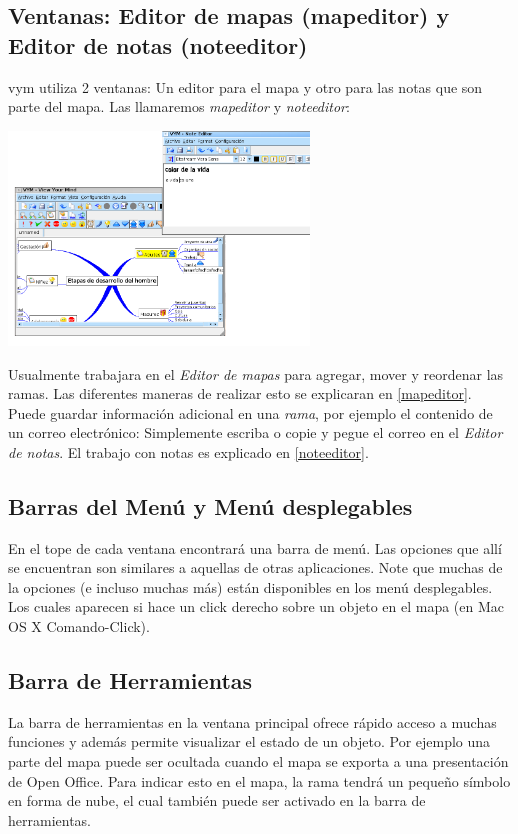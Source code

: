 \documentclass{article}
\newcommand{\vym}{{\sc vym }}
\begin{document}
\subsection{Ventanas: Editor de mapas (mapeditor) y Editor de notas (noteeditor)}
\vym utiliza 2 ventanas: Un editor para el mapa y otro para las notas que son parte del mapa. Las llamaremos  {\em mapeditor} y {\em noteeditor}: 
\begin{center}
    \includegraphics[width=8cm]{images/windows_es.png}
\end{center}
Usualmente trabajara en el {\em Editor de mapas} para agregar, mover y reordenar las ramas. Las diferentes maneras de realizar esto se explicaran en \ref{mapeditor}. Puede guardar informaci\'on adicional en una {\em rama}, por ejemplo el contenido de un correo electr\'onico: Simplemente escriba o copie y pegue el correo en el {\em Editor de notas}. El trabajo con notas es explicado en \ref{noteeditor}.

\subsection{Barras del Men\'u y Men\'u desplegables}
En el tope de cada ventana encontrar\'a una barra de men\'u. Las opciones que all\'i se encuentran son similares a aquellas de otras aplicaciones. Note que muchas de la opciones (e incluso muchas m\'as) est\'an disponibles en los men\'u desplegables. Los cuales aparecen si hace un click derecho sobre un objeto en el mapa (en Mac OS X Comando-Click).

\subsection{Barra de Herramientas}
La barra de herramientas en la ventana principal ofrece r\'apido acceso a muchas funciones y adem\'as permite visualizar el estado de un objeto. Por ejemplo una parte del mapa puede ser ocultada cuando el mapa se exporta a una presentaci\'on de Open Office. Para indicar esto en el mapa, la rama tendr\'a un peque\~no s\'imbolo en forma de nube, el cual tambi\'en puede ser activado en la barra de herramientas.
\end{document}
